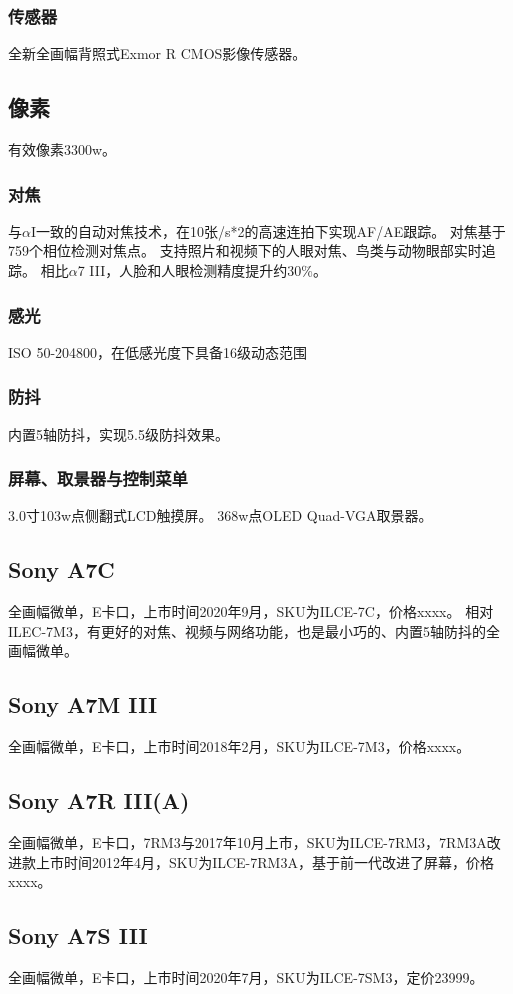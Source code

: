 \documentclass{ctexart}
\begin{document}
\subsubsection{传感器}
全新全画幅背照式Exmor R CMOS影像传感器。
\subsection{像素}
有效像素3300w。
\subsubsection{对焦}
与$\alpha$I一致的自动对焦技术，在10张/s*2的高速连拍下实现AF/AE跟踪。
对焦基于759个相位检测对焦点。
支持照片和视频下的人眼对焦、鸟类与动物眼部实时追踪。
相比$\alpha$7 III，人脸和人眼检测精度提升约30$\%$。
\subsubsection{感光}
ISO 50-204800，在低感光度下具备16级动态范围
\subsubsection{防抖}
内置5轴防抖，实现5.5级防抖效果。
\subsubsection{屏幕、取景器与控制菜单}
3.0寸103w点侧翻式LCD触摸屏。
368w点OLED Quad-VGA取景器。


\subsection{Sony A7C}
全画幅微单，E卡口，上市时间2020年9月，SKU为ILCE-7C，价格xxxx。
相对ILEC-7M3，有更好的对焦、视频与网络功能，也是最小巧的、内置5轴防抖的全画幅微单。
\subsection{Sony A7M III}
全画幅微单，E卡口，上市时间2018年2月，SKU为ILCE-7M3，价格xxxx。
\subsection{Sony A7R III(A)}
全画幅微单，E卡口，7RM3与2017年10月上市，SKU为ILCE-7RM3，7RM3A改进款上市时间2012年4月，SKU为ILCE-7RM3A，基于前一代改进了屏幕，价格xxxx。
\subsection{Sony A7S III}
全画幅微单，E卡口，上市时间2020年7月，SKU为ILCE-7SM3，定价23999。
\end{document}
